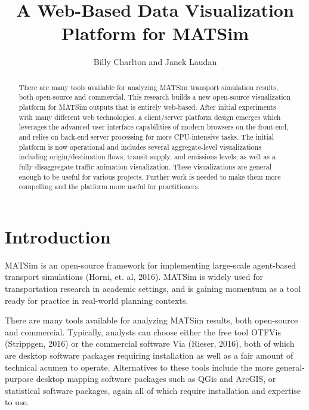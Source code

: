 \documentclass[Afour,sageh,times]{sagej}
\begin{document}

\title{A Web-Based Data Visualization Platform for MATSim}

\author{Billy Charlton and Janek Laudan}




\begin{abstract}
There are many tools available for analyzing MATSim transport
simulation results, both open-source and commercial. This research
builds a new open-source visualization platform for MATSim outputs that
is entirely web-based. After initial experiments with many different web
technologies, a client/server platform design emerges which leverages
the advanced user interface capabilities of modern browsers on the
front-end, and relies on back-end server processing for more CPU-intensive
tasks. The initial platform is now operational and includes several
aggregate-level visualizations including origin/destination flows,
transit supply, and emissions levels; as well as a fully disaggregate
traffic animation visualization. These visualizations are general
enough to be useful for various projects. Further work is needed
to make them more compelling and the platform more useful for practitioners.
\end{abstract}


\maketitle

\section{Introduction}

MATSim is an open-source framework for implementing large-scale agent-based transport simulations (Horni, et. al, 2016). MATSim is widely used for transportation research in academic settings, and is gaining momentum as a tool ready for practice in real-world planning contexts.

There are many tools available for analyzing MATSim results, both
open-source and commercial. Typically, analysts can choose either
the free tool OTFVis (Strippgen, 2016) or the commercial software
Via (Rieser, 2016), both of which are desktop software packages requiring installation as well as a fair amount of technical acumen to operate. Alternatives to these tools include the more general-purpose desktop mapping software packages such as QGis and ArcGIS, or statistical software packages, again all of which require installation and expertise to use.
\end{document}
